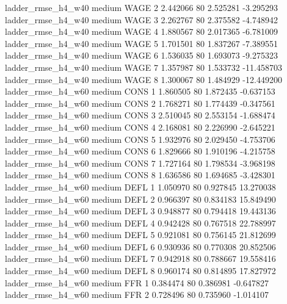  ladder_rmse_h4_w40     medium     WAGE                 2  2.442066 80       2.525281          -3.295293
 ladder_rmse_h4_w40     medium     WAGE                 3  2.262767 80       2.375582          -4.748942
 ladder_rmse_h4_w40     medium     WAGE                 4  1.880567 80       2.017365          -6.781009
 ladder_rmse_h4_w40     medium     WAGE                 5  1.701501 80       1.837267          -7.389551
 ladder_rmse_h4_w40     medium     WAGE                 6  1.536035 80       1.693073          -9.275323
 ladder_rmse_h4_w40     medium     WAGE                 7  1.357987 80       1.533732         -11.458703
 ladder_rmse_h4_w40     medium     WAGE                 8  1.300067 80       1.484929         -12.449200
 ladder_rmse_h4_w60     medium     CONS                 1  1.860505 80       1.872435          -0.637153
 ladder_rmse_h4_w60     medium     CONS                 2  1.768271 80       1.774439          -0.347561
 ladder_rmse_h4_w60     medium     CONS                 3  2.510045 80       2.553154          -1.688474
 ladder_rmse_h4_w60     medium     CONS                 4  2.168081 80       2.226990          -2.645221
 ladder_rmse_h4_w60     medium     CONS                 5  1.932976 80       2.029450          -4.753706
 ladder_rmse_h4_w60     medium     CONS                 6  1.829666 80       1.910196          -4.215758
 ladder_rmse_h4_w60     medium     CONS                 7  1.727164 80       1.798534          -3.968198
 ladder_rmse_h4_w60     medium     CONS                 8  1.636586 80       1.694685          -3.428301
 ladder_rmse_h4_w60     medium     DEFL                 1  1.050970 80       0.927845          13.270038
 ladder_rmse_h4_w60     medium     DEFL                 2  0.966397 80       0.834183          15.849490
 ladder_rmse_h4_w60     medium     DEFL                 3  0.948877 80       0.794418          19.443136
 ladder_rmse_h4_w60     medium     DEFL                 4  0.942428 80       0.767518          22.788997
 ladder_rmse_h4_w60     medium     DEFL                 5  0.921081 80       0.756145          21.812699
 ladder_rmse_h4_w60     medium     DEFL                 6  0.930936 80       0.770308          20.852506
 ladder_rmse_h4_w60     medium     DEFL                 7  0.942918 80       0.788667          19.558416
 ladder_rmse_h4_w60     medium     DEFL                 8  0.960174 80       0.814895          17.827972
 ladder_rmse_h4_w60     medium      FFR                 1  0.384474 80       0.386981          -0.647827
 ladder_rmse_h4_w60     medium      FFR                 2  0.728496 80       0.735960          -1.014107
